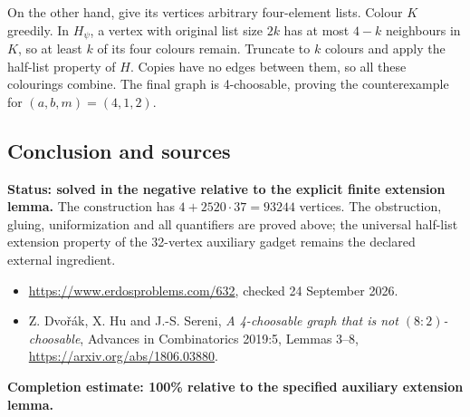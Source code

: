 On the other hand, give its vertices arbitrary four-element lists. Colour $K$ greedily. In $H_\psi$, a vertex with original list size $2k$ has at most $4-k$ neighbours in $K$, so at least $k$ of its four colours remain. Truncate to $k$ colours and apply the half-list property of $H$. Copies have no edges between them, so all these colourings combine. The final graph is 4-choosable, proving the counterexample for $(a,b,m)=(4,1,2)$.

\subsection*{Conclusion and sources}
\textbf{Status: solved in the negative relative to the explicit finite extension lemma.} The construction has $4+2520\cdot37=93244$ vertices. The obstruction, gluing, uniformization and all quantifiers are proved above; the universal half-list extension property of the 32-vertex auxiliary gadget remains the declared external ingredient.
\begin{itemize}
\item \url{https://www.erdosproblems.com/632}, checked 24 September 2026.
\item Z. Dvo\v r\'ak, X. Hu and J.-S. Sereni, \emph{A 4-choosable graph that is not $(8:2)$-choosable}, Advances in Combinatorics 2019:5, Lemmas 3--8, \url{https://arxiv.org/abs/1806.03880}.
\end{itemize}
\noindent\textbf{Completion estimate: 100\% relative to the specified auxiliary extension lemma.}
